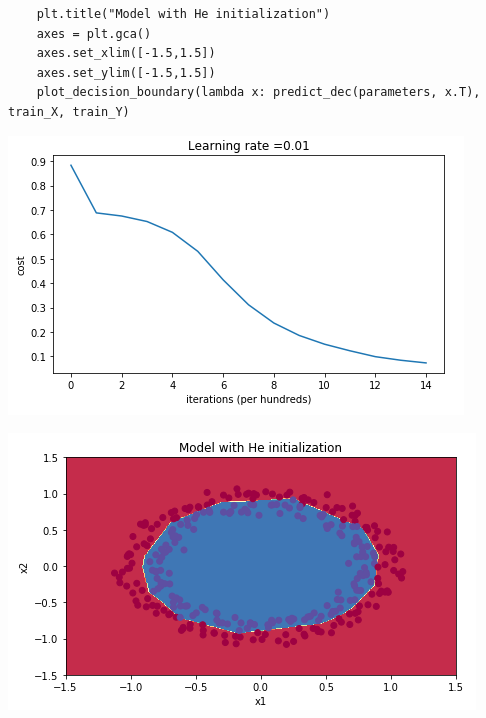 \documentclass[11pt, a4paper]{article}
\begin{document}
\begin{spacing}{1.1}
\begin{lstlisting}
	plt.title("Model with He initialization")
	axes = plt.gca()
	axes.set_xlim([-1.5,1.5])
	axes.set_ylim([-1.5,1.5])
	plot_decision_boundary(lambda x: predict_dec(parameters, x.T), train_X, train_Y) \end{lstlisting}
	\begin{minipage}[c]{8.5cm}
	\begin{center}\includegraphics[scale=0.5]{he_init} \end{center}
	\end{minipage}
	\begin{minipage}[c]{8.5cm}
	\begin{center}\includegraphics[scale=0.5]{he_init_dec} \end{center} 
	\end{minipage} \newpage


\end{spacing}
\end{document}
